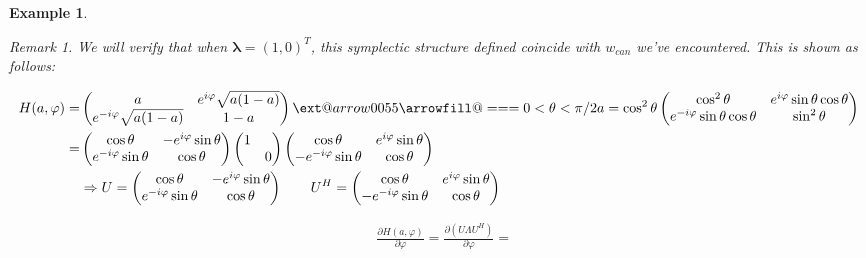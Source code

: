 \documentclass[11pt]{amsart}
\makeatletter
\numberwithin{equation}{section}
\theoremstyle{plain}
\newtheorem{eg}[theorem]{Example}
\theoremstyle{plain}
\numberwithin{equation}{section}
\theoremstyle{remark}
\newtheorem{remark}[theorem]{Remark}
\newcommand*{\Relbarfill@}{\arrowfill@\Relbar\Relbar\Relbar}
\newcommand*{\xeq}[2][]{\ext@arrow 0055\Relbarfill@{#1}{#2}}
\makeatother
\begin{document}
\begin{eg}
\begin{remark}
		We will verify that when $\bm{\lambda}=(1,0)^T$, this symplectic structure defined coincide with $w_{can}$ we've encountered. This is shown as follows:

\begin{list}{}%
	\item 
		\begin{equation*}
		\begin{aligned}
		H(a,\varphi)=&
		\begin{pmatrix}
		a & e^{i\varphi} \sqrt{a(1-a)} \\
		e^{-i\varphi} \sqrt{a(1-a)} & 1-a
		\end{pmatrix}
		\xeq[0<\theta<\pi/2]{a=\cos^2 \theta }%
		\begin{pmatrix}
		\cos^2 \theta & e^{i\varphi} \sin \theta \cos \theta \\
		e^{-i\varphi} \sin \theta \cos \theta & \sin^2 \theta
		\end{pmatrix}\\
		=&
		\begin{pmatrix}
		\cos \theta & -e^{i\varphi} \sin \theta  \\
		e^{-i\varphi} \sin \theta  & \cos \theta
		\end{pmatrix}
		\begin{pmatrix}
		1&\\
		&0
		\end{pmatrix}
		\begin{pmatrix}
		\cos \theta & e^{i\varphi} \sin \theta  \\
		-e^{-i\varphi} \sin \theta  & \cos \theta
		\end{pmatrix}\\
			&\Rightarrow U=\begin{pmatrix}
		\cos \theta & -e^{i\varphi} \sin \theta  \\
		e^{-i\varphi} \sin \theta  & \cos \theta
		\end{pmatrix} \qquad
		U^H=\begin{pmatrix}
		\cos \theta & e^{i\varphi} \sin \theta  \\
		-e^{-i\varphi} \sin \theta  & \cos \theta
		\end{pmatrix}
		\end{aligned}
		\end{equation*}
	\item 
		\begin{equation*}
		\begin{aligned}
		&\frac{\partial H(a,\varphi)}{\partial \varphi}=
		\frac{\partial (U\Lambda U^H)}{\partial \varphi}=

\end{aligned}
\end{equation*}
\end{list}
\end{remark}
\end{eg}
\end{document}
